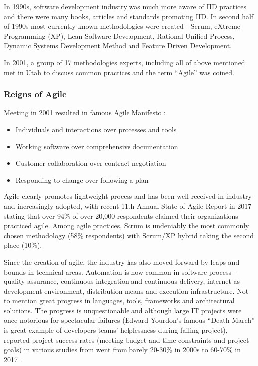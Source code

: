 \documentclass{article}
\begin{document}
In 1990s, software development industry was much more aware of IID practices and there were many books, articles and standards promoting IID. In second half of 1990s most currently known methodologies were created - Scrum, eXtreme Programming (XP), Lean Software Development, Rational Unified Process, Dynamic Systems Development Method and Feature Driven Development.

In 2001, a group of 17 methodologies experts, including all of above mentioned met in Utah to discuss common practices and the term ``Agile'' was coined.

\subsubsection{Reigns of Agile}

Meeting in 2001 resulted in famous Agile Manifesto \cite{beck2001agile}:
\begin{itemize}
  \item Individuals and interactions over processes and tools
  \item Working software over comprehensive documentation
  \item Customer collaboration over contract negotiation
  \item Responding to change over following a plan
\end{itemize}

Agile clearly promotes lightweight process and has been well received in industry and increasingly adopted, with recent 11th Annual State of Agile Report in 2017 \cite{one201711th} stating that over 94\% of over 20,000 respondents claimed their organizations practiced agile. %
Among agile practices, Scrum is undeniably the most commonly chosen methodology (58\% respondents) with Scrum/XP hybrid taking the second place (10\%).

Since the creation of agile, the industry has also moved forward by leaps and bounds in technical areas. Automation is now common in software process - quality assurance, continuous integration and continuous delivery, internet as development environment, distribution means and execution infrastructure. Not to mention great progress in languages, tools, frameworks and architectural solutions. \cite{fuggetta2014software}
The progress is unquestionable and although large IT projects were once notorious for spectacular failures (Edward Yourdon's famous ``Death March'' \cite{yourdon1997death} is great example of developers teams' helplessness during failing project), reported project success rates (meeting budget and time constraints and project goals) in various studies from went from barely 20-30\% in 2000s \cite{kaur2013software} to 60-70\% in 2017 \cite{pmi2017pulse}.
\end{document}
